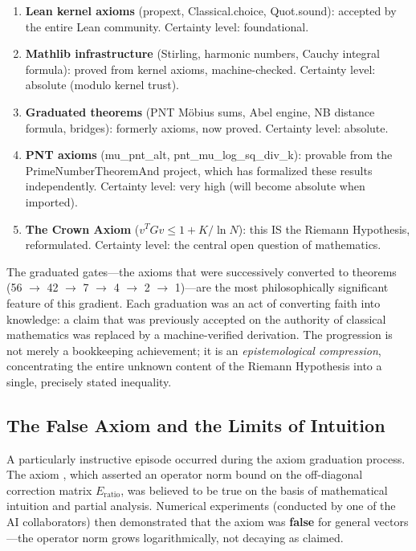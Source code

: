 \begin{enumerate}
  \item \textbf{Lean kernel axioms} (propext, Classical.choice,
    Quot.sound): accepted by the entire Lean community. Certainty
    level: foundational.

  \item \textbf{Mathlib infrastructure} (Stirling, harmonic numbers,
    Cauchy integral formula): proved from kernel axioms, machine-checked.
    Certainty level: absolute (modulo kernel trust).

  \item \textbf{Graduated theorems} (PNT Möbius sums, Abel engine,
    NB distance formula, bridges): formerly axioms, now proved.
    Certainty level: absolute.

  \item \textbf{PNT axioms} (mu\_pnt\_alt, pnt\_mu\_log\_sq\_div\_k):
    provable from the PrimeNumberTheoremAnd project, which has
    formalized these results independently. Certainty level:
    very high (will become absolute when imported).

  \item \textbf{The Crown Axiom} ($v^TGv \leq 1 + K/\ln N$): this
    IS the Riemann Hypothesis, reformulated. Certainty level:
    the central open question of mathematics.
\end{enumerate}

The graduated gates---the axioms that were successively converted
to theorems (56 $\to$ 42 $\to$ 7 $\to$ 4 $\to$ 2 $\to$ 1)---are
the most philosophically significant feature of this gradient. Each
graduation was an act of converting faith into knowledge: a claim
that was previously accepted on the authority of classical
mathematics was replaced by a machine-verified derivation. The
progression is not merely a bookkeeping achievement; it is an
\emph{epistemological compression}, concentrating the entire
unknown content of the Riemann Hypothesis into a single, precisely
stated inequality.

\subsection{The False Axiom and the Limits of Intuition}

A particularly instructive episode occurred during the axiom
graduation process. The axiom ,
which asserted an operator norm bound on the off-diagonal correction
matrix $E_{\mathrm{ratio}}$, was believed to be true on the basis
of mathematical intuition and partial analysis. Numerical
experiments (conducted by one of the AI collaborators) then
demonstrated that the axiom was \textbf{false} for general
vectors---the operator norm grows logarithmically, not decaying
as claimed.

